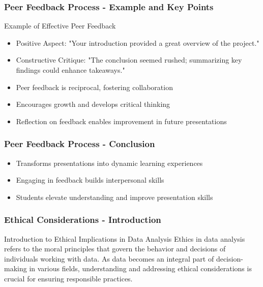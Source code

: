 \documentclass[aspectratio=169]{beamer}
\begin{document}
\begin{frame}[fragile]
    \frametitle{Peer Feedback Process - Example and Key Points}
    \begin{block}{Example of Effective Peer Feedback}
        \begin{itemize}
            \item Positive Aspect: "Your introduction provided a great overview of the project."
            \item Constructive Critique: "The conclusion seemed rushed; summarizing key findings could enhance takeaways."
        \end{itemize}
    \end{block}
    
    \begin{itemize}
        \item Peer feedback is reciprocal, fostering collaboration
        \item Encourages growth and develops critical thinking
        \item Reflection on feedback enables improvement in future presentations
    \end{itemize}
\end{frame}

\begin{frame}[fragile]
    \frametitle{Peer Feedback Process - Conclusion}
    \begin{itemize}
        \item Transforms presentations into dynamic learning experiences
        \item Engaging in feedback builds interpersonal skills
        \item Students elevate understanding and improve presentation skills
    \end{itemize}
\end{frame}

\begin{frame}[fragile]
    \frametitle{Ethical Considerations - Introduction}
    \begin{block}{Introduction to Ethical Implications in Data Analysis}
        Ethics in data analysis refers to the moral principles that govern the behavior and decisions of individuals working with data. As data becomes an integral part of decision-making in various fields, understanding and addressing ethical considerations is crucial for ensuring responsible practices.
    \end{block}
\end{frame}
\end{document}
